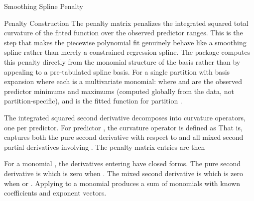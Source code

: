 \begin{Section}{Smoothing Spline Penalty}


%
\begin{SubSection}{Penalty Construction}
The penalty matrix  penalizes the integrated
squared total curvature of the fitted function over the observed predictor
ranges. This is the step that makes the piecewise polynomial fit genuinely
behave like a smoothing spline rather than merely a constrained regression
spline. The package computes this penalty directly from the monomial
structure of the basis rather than by appealing to a pre-tabulated spline
basis. For a single partition  with basis expansion
where each 
is a multivariate monomial:
where  and  are the observed predictor
minimums and maximums (computed globally from the data, not
partition-specific), and
is the fitted function for partition .

The integrated squared second derivative decomposes into 
curvature operators, one per predictor. For predictor , the
curvature operator  is defined as
That is,  captures both the pure second derivative with respect
to  and all mixed second partial derivatives involving .
The penalty matrix entries are then

For a monomial , the
derivatives entering  have closed forms. The pure second
derivative is
which is zero when . The mixed second derivative is
which is zero when  or . Applying
 to a monomial  produces a sum of monomials with
known coefficients and exponent vectors.


\end{SubSection}
\end{Section}
